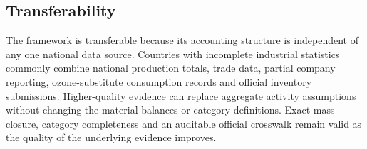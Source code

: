 \subsection{Transferability}

The framework is transferable because its accounting structure is independent of any one
national data source. Countries with incomplete industrial statistics commonly combine
national production totals, trade data, partial company reporting, ozone-substitute
consumption records and official inventory submissions. Higher-quality evidence can replace
aggregate activity assumptions without changing the material balances or category
definitions. Exact mass closure, category completeness and an auditable official crosswalk
remain valid as the quality of the underlying evidence improves.
